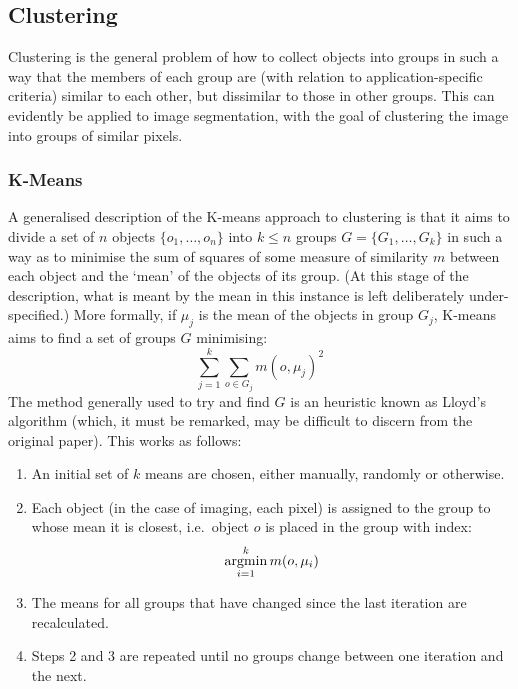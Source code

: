 
\subsection{Clustering}

Clustering is the general problem of how to collect objects into groups in such a way that the members of each group are (with relation to application-specific criteria) similar to each other, but dissimilar to those in other groups. This can evidently be applied to image segmentation, with the goal of clustering the image into groups of similar pixels.

\subsubsection{K-Means}

A generalised description of the K-means approach to clustering is that it aims to divide a set of $n$ objects $\{o_1,\ldots,o_n\}$ into $k \le n$ groups $G = \{G_1,\ldots,G_k\}$ in such a way as to minimise the sum of squares of some measure of similarity $m$ between each object and the `mean' of the objects of its group. (At this stage of the description, what is meant by the mean in this instance is left deliberately under-specified.) More formally, if $\mu_j$ is the mean of the objects in group $G_j$, K-means aims to find a set of groups $G$ minimising:
%
\[
\sum_{j=1}^k \sum_{o \in G_j} m(o, \mu_j)^2
\]
%
The method generally used to try and find $G$ is an heuristic known as Lloyd's algorithm \cite{lloyd82} (which, it must be remarked, may be difficult to discern from the original paper). This works as follows:

\begin{enumerate}

\item An initial set of $k$ means are chosen, either manually, randomly or otherwise.

\item Each object (in the case of imaging, each pixel) is assigned to the group to whose mean it is closest, i.e.~object $o$ is placed in the group with index:
%
\[
\mathop{\rm argmin}_{i=1}^k m(o, \mu_i)
\]

\item The means for all groups that have changed since the last iteration are recalculated.

\item Steps 2 and 3 are repeated until no groups change between one iteration and the next.

\end{enumerate}

